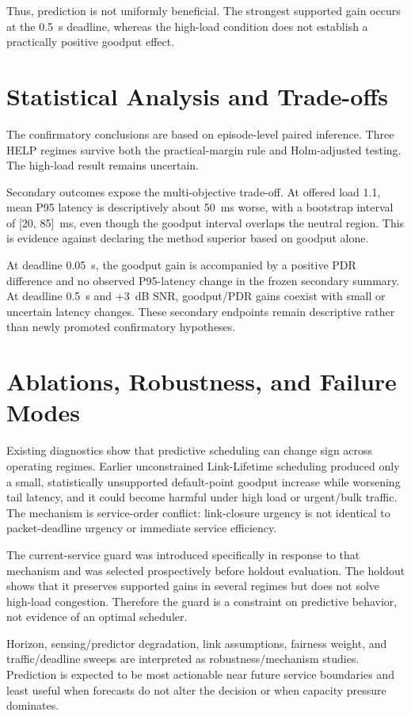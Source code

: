 \documentclass[conference]{IEEEtran}
\begin{document}
Thus, prediction is not uniformly beneficial. The strongest supported gain occurs at the 0.5~s deadline, whereas the high-load condition does not establish a practically positive goodput effect.

\section{Statistical Analysis and Trade-offs}
The confirmatory conclusions are based on episode-level paired inference. Three HELP regimes survive both the practical-margin rule and Holm-adjusted testing. The high-load result remains uncertain.

Secondary outcomes expose the multi-objective trade-off. At offered load 1.1, mean P95 latency is descriptively about 50~ms worse, with a bootstrap interval of [20, 85]~ms, even though the goodput interval overlaps the neutral region. This is evidence against declaring the method superior based on goodput alone.

At deadline 0.05~s, the goodput gain is accompanied by a positive PDR difference and no observed P95-latency change in the frozen secondary summary. At deadline 0.5~s and +3~dB SNR, goodput/PDR gains coexist with small or uncertain latency changes. These secondary endpoints remain descriptive rather than newly promoted confirmatory hypotheses.

\section{Ablations, Robustness, and Failure Modes}
Existing diagnostics show that predictive scheduling can change sign across operating regimes. Earlier unconstrained Link-Lifetime scheduling produced only a small, statistically unsupported default-point goodput increase while worsening tail latency, and it could become harmful under high load or urgent/bulk traffic. The mechanism is service-order conflict: link-closure urgency is not identical to packet-deadline urgency or immediate service efficiency.

The current-service guard was introduced specifically in response to that mechanism and was selected prospectively before holdout evaluation. The holdout shows that it preserves supported gains in several regimes but does not solve high-load congestion. Therefore the guard is a constraint on predictive behavior, not evidence of an optimal scheduler.

Horizon, sensing/predictor degradation, link assumptions, fairness weight, and traffic/deadline sweeps are interpreted as robustness/mechanism studies. Prediction is expected to be most actionable near future service boundaries and least useful when forecasts do not alter the decision or when capacity pressure dominates.
\end{document}
